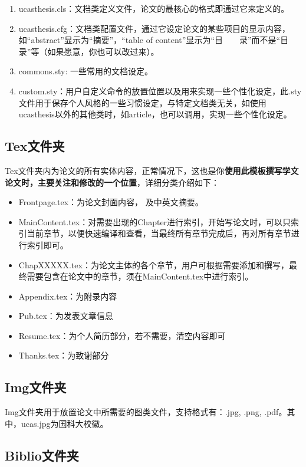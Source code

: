 \begin{enumerate}
  \item ucasthesis.cls：文档类定义文件，论文的最核心的格式即通过它来定义的。
  \item ucasthesis.cfg：文档类配置文件，通过它设定论文的某些项目的显示内容，如“abstract”显示为“摘要”，“table of content”显示为“目~~~~录”而不是“目录”等（如果愿意，你也可以改过来）。
  \item commons.sty: 一些常用的文档设定。
  \item custom.sty：用户自定义命令的放置位置以及用来实现一些个性化设定，此.sty文件用于保存个人风格的一些习惯设定，与特定文档类无关，如使用ucasthesis以外的其他类时，如article，也可以调用，实现一些个性化设定。
\end{enumerate}

\subsection{Tex文件夹}

Tex文件夹内为论文的所有实体内容，正常情况下，这也是你\textbf{使用此模板撰写学文论文时，主要关注和修改的一个位置}，详细分类介绍如下：

\begin{itemize}
  \item Frontpage.tex：为论文封面内容， 及中英文摘要。
  \item Main\textunderscore Content.tex：对需要出现的Chapter进行索引，开始写论文时，可以只索引当前章节，以便快速编译和查看，当最终所有章节完成后，再对所有章节进行索引即可。
  \item Chap\textunderscore XXXXX.tex：为论文主体的各个章节，用户可根据需要添加和撰写，最终需要包含在论文中的章节，须在Main\textunderscore Content.tex中进行索引。
  \item Appendix.tex：为附录内容
  \item Pub.tex：为发表文章信息
  \item Resume.tex：为个人简历部分，若不需要，清空内容即可
  \item Thanks.tex：为致谢部分
\end{itemize}

\subsection{Img文件夹}

Img文件夹用于放置论文中所需要的图类文件，支持格式有：.jpg, .png, .pdf。其中，ucas.jpg为国科大校徽。

\subsection{Biblio文件夹}


